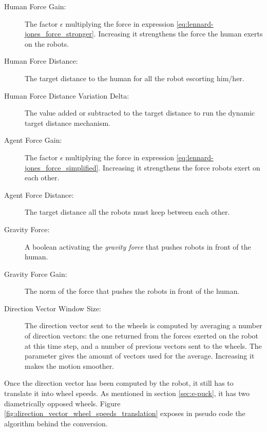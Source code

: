 \documentclass[oneside, a4paper, 12pt]{memoir}
\begin{document}
	\begin{description}
		\item[Human Force Gain:] The factor $\epsilon$ multiplying the force in expression \ref{eq:lennard-jones_force_stronger}. Increasing it strengthens the force the human exerts on the robots.
		\item[Human Force Distance:] The target distance to the human for all the robot escorting him/her.
		\item[Human Force Distance Variation Delta:] The value added or subtracted to the target distance to run the dynamic target distance mechanism.
		\item[Agent Force Gain:] The factor $\epsilon$ multiplying the force in expression \ref{eq:lennard-jones_force_simplified}. Increasing it strengthens the force robots exert on each other.
		\item[Agent Force Distance:] The target distance all the robots must keep between each other.
		\item[Gravity Force:] A boolean activating the \emph{gravity force} that pushes robots in front of the human.
		\item[Gravity Force Gain:] The norm of the force that pushes the robots in front of the human.
		\item[Direction Vector Window Size:] The direction vector sent to the wheels is computed by averaging a number of direction vectors: the one returned from the forces exerted on the robot at this time step, and a number of previous vectors sent to the wheels. The parameter gives the amount of vectors used for the average. Increasing it makes the motion smoother.
	\end{description}
Once the direction vector has been computed by the robot, it still has to translate it into wheel speeds. As mentioned in section \ref{sec:e-puck}, it has two diametrically opposed wheels. Figure \ref{fig:direction_vector_wheel_speeds_translation} exposes in pseudo code the algorithm behind the conversion.
	
\end{document}
